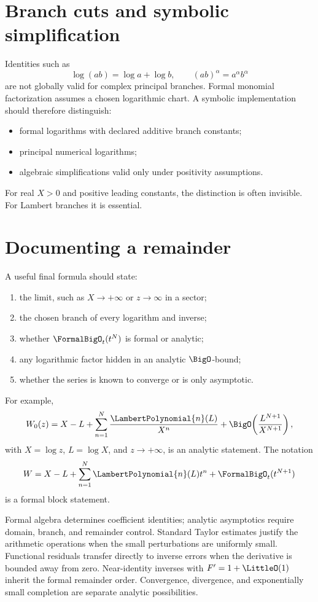 \documentclass[11pt,openany]{book}
\theoremstyle{definition}
\theoremstyle{plain}
\theoremstyle{remark}
\begin{document}
\section{Branch cuts and symbolic simplification}
Identities such as
\[
 \log(ab)=\log a+\log b,
 \qquad
 (ab)^\alpha=a^\alpha b^\alpha
\]
are not globally valid for complex principal branches.  Formal monomial
factorization assumes a chosen logarithmic chart.  A symbolic implementation
should therefore distinguish:
\begin{itemize}
\item formal logarithms with declared additive branch constants;
\item principal numerical logarithms;
\item algebraic simplifications valid only under positivity assumptions.
\end{itemize}
For real \(X>0\) and positive leading constants, the distinction is often
invisible.  For Lambert branches it is essential.

\section{Documenting a remainder}
A useful final formula should state:
\begin{enumerate}
\item the limit, such as \(X\to+\infty\) or \(z\to\infty\) in a sector;
\item the chosen branch of every logarithm and inverse;
\item whether \(\FormalBigO_t(t^N)\) is formal or analytic;
\item any logarithmic factor hidden in an analytic \(\BigO\)-bound;
\item whether the series is known to converge or is only asymptotic.
\end{enumerate}
For example,
\[
 W_0(z)=X-L+\sum_{n=1}^N\frac{\LambertPolynomial{n}(L)}{X^n}
 +\BigO\!\left(\frac{L^{N+1}}{X^{N+1}}\right),
\]
with \(X=\log z\), \(L=\log X\), and \(z\to+\infty\), is an analytic
statement.  The notation
\[
 W=X-L+\sum_{n=1}^N\LambertPolynomial{n}(L)t^n+\FormalBigO_t(t^{N+1})
\]
is a formal block statement.

\begin{summarybox}
Formal algebra determines coefficient identities; analytic asymptotics require
domain, branch, and remainder control.  Standard Taylor estimates justify the
arithmetic operations when the small perturbations are uniformly small.
Functional residuals transfer directly to inverse errors when the derivative
is bounded away from zero.  Near-identity inverses with \(F'=1+\LittleO(1)\) inherit
the formal remainder order.  Convergence, divergence, and exponentially small
completion are separate analytic possibilities.
\end{summarybox}
\end{document}
